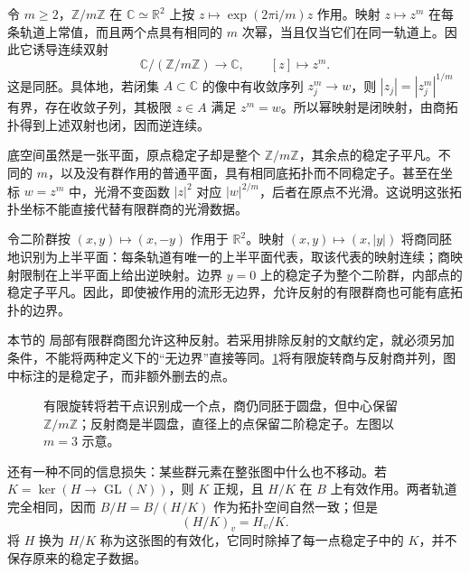 \begin{example}\label{g1:exm:rotation-orbifold-chart}
	令 \(m\geq2\)，\(\mathbb Z/m\mathbb Z\) 在 \(\mathbb C\simeq\mathbb R^2\) 上按 \(z\mapsto\exp(2\pi\mathrm{i}/m)z\) 作用。映射 \(z\mapsto z^m\) 在每条轨道上常值，而且两个点具有相同的 \(m\) 次幂，当且仅当它们在同一轨道上。因此它诱导连续双射
	\[
		\mathbb C/(\mathbb Z/m\mathbb Z)\longrightarrow\mathbb C,\qquad [z]\longmapsto z^m.
	\]
	这是同胚。具体地，若闭集 \(A\subset\mathbb C\) 的像中有收敛序列 \(z_j^m\to w\)，则 \(|z_j|=|z_j^m|^{1/m}\) 有界，存在收敛子列，其极限 \(z\in A\) 满足 \(z^m=w\)。所以幂映射是闭映射，由商拓扑得到上述双射也闭，因而逆连续。

	底空间虽然是一张平面，原点稳定子却是整个 \(\mathbb Z/m\mathbb Z\)，其余点的稳定子平凡。不同的 \(m\)，以及没有群作用的普通平面，具有相同底拓扑而不同稳定子。甚至在坐标 \(w=z^m\) 中，光滑不变函数 \(|z|^2\) 对应 \(|w|^{2/m}\)，后者在原点不光滑。这说明这张拓扑坐标不能直接代替有限群商的光滑数据。
\end{example}

\begin{example}\label{g1:exm:reflection-orbifold-chart}
	令二阶群按 \((x,y)\mapsto(x,-y)\) 作用于 \(\mathbb R^2\)。映射 \((x,y)\mapsto(x,|y|)\) 将商同胚地识别为上半平面：每条轨道有唯一的上半平面代表，取该代表的映射连续；商映射限制在上半平面上给出逆映射。边界 \(y=0\) 上的稳定子为整个二阶群，内部点的稳定子平凡。因此，即使被作用的流形无边界，允许反射的有限群商也可能有底拓扑的边界。

	本节的 局部有限群商图允许这种反射。若采用排除反射的文献约定，就必须另加条件，不能将两种定义下的“无边界”直接等同。\cref{g1:fig:finite-quotient-data}将有限旋转商与反射商并列，图中标注的是稳定子，而非额外删去的点。
\end{example}

\begin{figure}[htbp]
	\centering
	
	\caption[有限群商中的稳定子]{有限旋转将若干点识别成一个点，商仍同胚于圆盘，但中心保留 \(\mathbb Z/m\mathbb Z\)；反射商是半圆盘，直径上的点保留二阶稳定子。左图以 \(m=3\) 示意。}
	\label{g1:fig:finite-quotient-data}
\end{figure}

还有一种不同的信息损失：某些群元素在整张图中什么也不移动。若 \(K=\ker(H\to\operatorname{GL}(N))\)，则 \(K\) 正规，且 \(H/K\) 在 \(B\) 上有效作用。两者轨道完全相同，因而 \(B/H=B/(H/K)\) 作为拓扑空间自然一致；但是
\[
	(H/K)_v=H_v/K.
\]
将 \(H\) 换为 \(H/K\) 称为这张图的有效化，它同时除掉了每一点稳定子中的 \(K\)，并不保存原来的稳定子数据。

